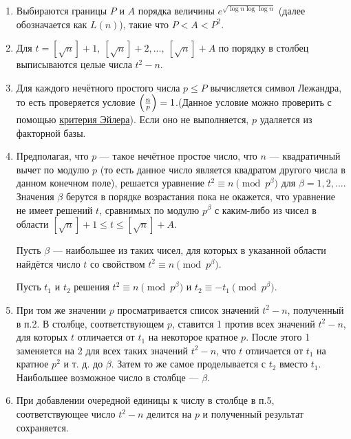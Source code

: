 \documentclass[12pt,a4paper]{scrartcl}
\begin{document}
\begin{enumerate}
	\item Выбираются границы $P$ и $A$ порядка величины $e^{\sqrt {\log {n}\log {\log {n}}}}$ (далее обозначается как $L(n)$), такие что $P<A<P^{2}$.
	
	\item Для $t=[{\sqrt {n}}]+1,\ \left[{\sqrt {n}}\right]+2,...,\ \left[{\sqrt {n}}\right]+A$ по порядку в столбец выписываются целые числа $t^{2}-n$.
	
	\item Для каждого нечётного простого числа $p\leq P$ вычисляется символ Лежандра, то есть проверяется условие $\left({n \over p}\right)=1$.(Данное условие можно проверить с помощью \href{https://yatb.kksctf.ru/}{критерия Эйлера}). Если оно не выполняется, $p$ удаляется из факторной базы.
	
	\item Предполагая, что $p$ — такое нечётное простое число, что $n$ — квадратичный вычет по модулю $p$ (то есть данное число является квадратом другого числа в данном конечном поле), решается уравнение $t^{2}\equiv n{\pmod {p^{\beta }}}$ для $\beta = 1,2,...$. Значения $\beta$ берутся в порядке возрастания пока не окажется, что уравнение не имеет решений $t$, сравнимых по модулю $p^{\beta }$ с каким-либо из чисел в области $\left[{\sqrt {n}}\right]+1\leq t\leq \left[{\sqrt {n}}\right]+A$.
	
	Пусть $\beta$  — наибольшее из таких чисел, для которых в указанной области найдётся число $t$ со свойством $t^{2}\equiv n{\pmod {p^{\beta }}}$.
	
	Пусть $t_{1}$ и $t_{2}$ решения $t^{2}\equiv n{\pmod {p^{\beta }}}$ и $\displaystyle t_{2}\equiv -t_{1}{\pmod {p^{\beta }}}$.
	
	\item При том же значении $p$ просматривается список значений $t^{2}-n$, полученный в п.2. В столбце, соответствующем $p$, ставится 1 против всех значений $t^{2}-n$, для которых $t$ отличается от $t_{1}$ на некоторое кратное $p$. После этого 1 заменяется на 2 для всех таких значений $t^{2}-n$, что $t$ отличается от $t_{1}$ на кратное $p^{2}$ и т. д. до $\beta$. Затем то же самое проделывается с $t_{2}$ вместо $t_{1}$. Наибольшее возможное число в столбце — $\beta$.
	
	\item При добавлении очередной единицы к числу в столбце в п.5, соответствующее число $t^{2}-n$ делится на $p$ и полученный результат сохраняется.
	

\end{enumerate}
\end{document}
